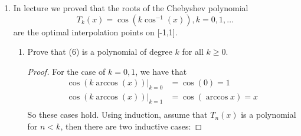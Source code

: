 \documentclass{article}
\begin{document}
\begin{enumerate}
\begin{enumerate}
\begin{proof}
                \end{proof} 
                From this, it follows immediately that taking $n+1$ derivatives of a function with $n+2$ roots will have one root in the same span.
            \item Prove (5).
                \begin{proof}
                    Since $p$ is a polynomial of degree $n$, taking $n+1$ derivatives will immediately cause it to vanish. On the otherhand, for $W(t)$, we know it is a polynomial of degree $n+1$ from (a), so taking the $(n+1)$th derivative gives us the leading coefficient times $(n+1)!$. Looking back at how $W(t)$ is setup though, since none of the $t$ in each binomial term have any coefficient the resulting expanded polynomials leading coefficient will be 1. This means the $(n+1)$th derivative of $CW(t)$ is just $C(n+1)!$.
                    \begin{align*} 
                        \implies F^{(n+1)}(t) &= \frac{d^{n+1}}{dt^{n+1}}[y(t) - p(t) - CW(t)] \\
                        &= \frac{d^{n+1}}{dt^{n+1}}y(t) - \frac{d^{n+1}}{dt^{n+1}}p(t) - \frac{d^{n+1}}{dt^{n+1}}CW(t)  \\
                        &= y^{(n+1)}(t) - (n+1)!C.
                    \end{align*}
                \end{proof}  
        \end{enumerate}
    \newpage
    \item In lecture we proved that the roots of the Chebyshev polynomial
        \begin{equation}
            T_k(x) = \cos(k\cos^{-1}(x)), k=0,1,\dots
        \end{equation}
        are the optimal interpolation points on [-1,1].
        \begin{enumerate}
            \item Prove that (6) is a polynomial of degree $k$ for all $k \geq 0$.
                \begin{proof}
                    For the case of $k= 0,  1$, we have that 
                    \begin{align*}
                        \cos(k\arccos(x)) |_{k=0} &= \cos(0) = 1 \\
                        \cos(k\arccos(x)) |_{k=1} &= \cos(\arccos x) = x \\
                    \end{align*}
                    So these cases hold. Using induction, assume that $T_n(x)$ is a polynomial for $n < k$, then there are two inductive cases:


\end{proof}
\end{enumerate}
\end{enumerate}
\end{document}
